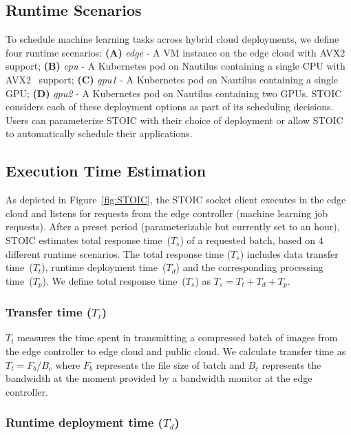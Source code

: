 \subsection{Runtime Scenarios}

To schedule machine learning tasks across hybrid cloud deployments, we define
four runtime scenarios: \textbf{(A)} \textit{edge} - A VM instance on the edge
cloud with AVX2~\cite{ref:avx} support; \textbf{(B)} \textit{cpu} - A
Kubernetes pod on Nautilus containing a single CPU with AVX2~\cite{ref:avx}
support; \textbf{(C)} \textit{gpu1} - A Kubernetes pod on Nautilus containing
a single GPU; \textbf{(D)} \textit{gpu2} - A Kubernetes pod on Nautilus
containing two GPUs.  STOIC considers each of these deployment options as part
of its scheduling decisions. Users can parameterize STOIC with their choice of
deployment or allow STOIC to automatically schedule their applications.


\subsection{Execution Time Estimation}

As depicted in Figure~\ref{fig:STOIC}, the STOIC socket client executes in the
edge cloud and listens for requests from the edge controller (machine learning
job requests). After a preset period (parameterizable but currently set to an
hour), STOIC estimates total response time~($T_s$) of a requested batch, based
on 4 different runtime scenarios. The total response time ($T_s$) includes
data transfer time~($T_t$), runtime deployment time~($T_d$) and the
corresponding processing time~($T_p$). We define total response time~($T_s$)
as $T_s = T_t + T_d + T_p$.
 
\subsubsection{Transfer time ($T_t$)} 

$T_t$ measures the time spent in transmitting a compressed batch of images
from the edge controller to edge cloud and public cloud.  We calculate
transfer time as ${T_t = F_b / B_c}$ where $F_b$ represents the file size of
batch and $B_c$ represents the bandwidth at the moment provided by a bandwidth
monitor at the edge controller. 
 
\subsubsection{Runtime deployment time ($T_d$)} 

